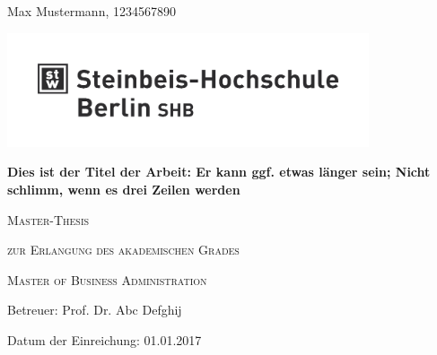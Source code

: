 
\begin{titlepage}
	\centering
	{\Large Max Mustermann, 1234567890\par}
	\vspace{0.5cm}
	\includegraphics[width=0.8\textwidth]{images_layout/logo_shb.png}\par

	\vspace{1.5cm}
	{\huge\bfseries Dies ist der Titel der Arbeit: Er kann ggf. etwas länger sein; Nicht schlimm, wenn es drei Zeilen werden\par}	
	
	\vspace{2cm}
	{\scshape\Large Master-Thesis\par}
	\vspace{0.5cm}
	{\scshape\Large zur Erlangung des akademischen Grades\par}
	\vspace{0.5cm}
	{\scshape\Large Master of Business Administration \par}	
	
	\vfill

	{\large Betreuer: Prof. Dr. Abc Defghij\par}
	{\large Datum der Einreichung: 01.01.2017\par}
\end{titlepage}

\restoregeometry